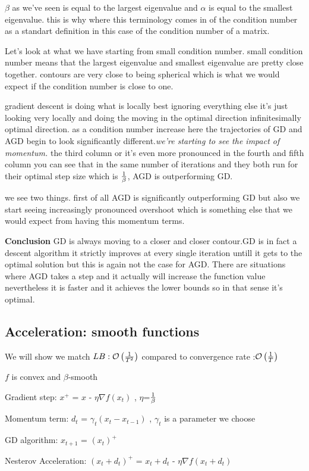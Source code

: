 \documentclass[twoside]{article}
\begin{document}
$\beta$ as we've seen is equal to the largest eigenvalue and $\alpha$ is equal to the smallest eigenvalue. this is why where this terminology comes in of the condition number as a standart definition in this case of the condition number of a matrix. 

Let's look at what we have starting from small condition number. small condition number means that the largest eigenvalue and smallest eigenvalue are pretty close together. contours are very close to being spherical which is what we would expect if the condition number is close to one. 

gradient descent is doing what is locally best ignoring everything else it's just looking very locally and doing the moving in the optimal direction infinitesimally optimal direction. as a condition number increase here the trajectories of GD and AGD begin to look significantly different.{\it we're starting to see the impact of momentum.} the third column or it's even more pronounced in the fourth and fifth column you can see that in the same number of iterations and they both run for their optimal step size which is $1 \over \beta$, AGD is outperforming GD. 

we see two things. first of all AGD is significantly outperforming GD but also we start seeing increasingly pronounced overshoot which is something else that we would expect from having this momentum terms.

\textbf{Conclusion}
GD is always moving to a closer and closer contour.GD is in fact a descent algorithm it strictly improves at every single iteration untill it gets to the optimal solution but this is again not the case for AGD. There are situations where AGD takes a step and it actually will increase the function value nevertheless it is faster and it achieves the lower bounds so in that sense it's optimal.

\subsection{Acceleration: smooth functions}
We will show we match $LB: \mathcal{O}\left({1 \over T^2}\right)$ compared to convergence rate :$\mathcal{O}\left({1 \over T}\right)$
\begin{center}

$f$ is convex and $\beta$-smooth

Gradient step: $x^{+}$ = $x$ - ${\eta}$${\nabla}$$f(x_t)$ , ${\eta}$=${1 \over \beta}$

Momentum term: $d_t$ = $\gamma_t{\left(x_t - x_{t-1}\right)}$ , $\gamma_t$ is a parameter we choose

GD algorithm: $x_{t+1}$ = $(x_t)^+$

Nesterov Acceleration: $(x_t + d_t)^+$ = $x_t+d_t$ - $\eta \nabla f(x_t+d_t)$
\end{center}
\end{document}
